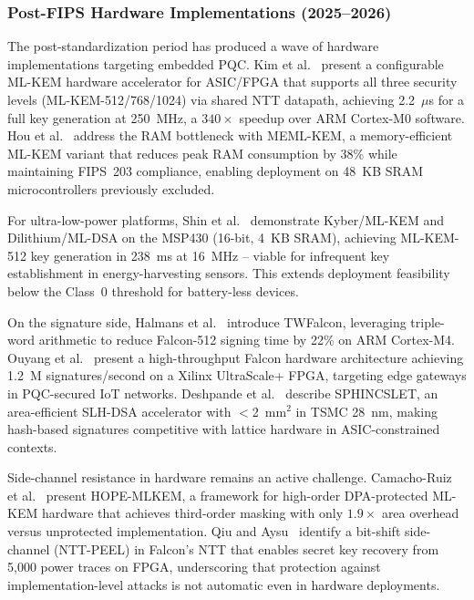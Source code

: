 \documentclass[journal]{IEEEtran}
\begin{document}
\subsubsection{Post-FIPS Hardware Implementations (2025--2026)}

The post-standardization period has produced a wave of hardware implementations
targeting embedded PQC. Kim et al.~\cite{kim2024mlkem} present a configurable
ML-KEM hardware accelerator for ASIC/FPGA that supports all three security
levels (ML-KEM-512/768/1024) via shared NTT datapath, achieving 2.2~$\mu$s for
a full key generation at 250~MHz, a $340\times$ speedup over ARM Cortex-M0
software. Hou et al.~\cite{hou2025memlkem} address the RAM bottleneck with
MEML-KEM, a memory-efficient ML-KEM variant that reduces peak RAM consumption
by 38\% while maintaining FIPS~203 compliance, enabling deployment on 48~KB
SRAM microcontrollers previously excluded.

For ultra-low-power platforms, Shin et al.~\cite{shin2026msp430} demonstrate
Kyber/ML-KEM and Dilithium/ML-DSA on the MSP430 (16-bit, 4~KB SRAM),
achieving ML-KEM-512 key generation in 238~ms at 16~MHz -- viable for
infrequent key establishment in energy-harvesting sensors. This extends
deployment feasibility below the Class~0 threshold for battery-less devices.

On the signature side, Halmans et al.~\cite{halmans2026twfalcon} introduce
TWFalcon, leveraging triple-word arithmetic to reduce Falcon-512 signing time
by 22\% on ARM Cortex-M4. Ouyang et al.~\cite{ouyang2025falconsign} present a
high-throughput Falcon hardware architecture achieving 1.2~M signatures/second
on a Xilinx UltraScale+ FPGA, targeting edge gateways in PQC-secured IoT
networks. Deshpande et al.~\cite{deshpande2025sphincslet} describe SPHINCSLET,
an area-efficient SLH-DSA accelerator with $<$2~mm$^2$ in TSMC 28~nm, making
hash-based signatures competitive with lattice hardware in ASIC-constrained
contexts.

Side-channel resistance in hardware remains an active challenge. Camacho-Ruiz
et al.~\cite{camacho2026hopemlkem} present HOPE-MLKEM, a framework for
high-order DPA-protected ML-KEM hardware that achieves third-order masking with
only $1.9\times$ area overhead versus unprotected implementation. Qiu and
Aysu~\cite{qiu2026nttpeel} identify a bit-shift side-channel (NTT-PEEL) in
Falcon's NTT that enables secret key recovery from 5{,}000 power traces on
FPGA, underscoring that protection against implementation-level attacks is not
automatic even in hardware deployments.
\end{document}
